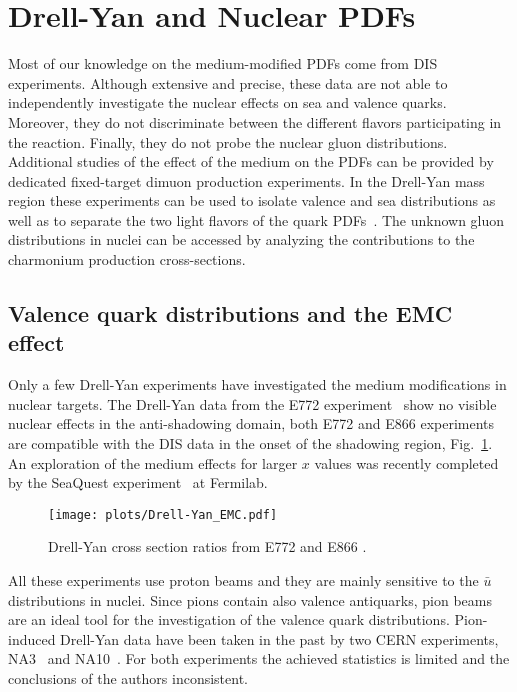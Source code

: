\section{Drell-Yan and Nuclear PDFs\label{sec:DY}}
%
Most of our knowledge on the medium-modified PDFs come from DIS experiments. Although extensive and precise, these data are not able to independently investigate the nuclear effects on sea and valence quarks. Moreover, they do not discriminate between the different flavors participating in the reaction. Finally, they do not probe the nuclear gluon distributions. Additional studies of the effect of the medium on the PDFs can be provided by dedicated fixed-target dimuon production experiments. In the Drell-Yan mass region  these experiments can be used to isolate valence and sea distributions as well as to separate the two light flavors of the quark PDFs~\cite{Bickerstaff:1985ax}. The unknown gluon distributions in nuclei can be accessed by analyzing the contributions to the charmonium production cross-sections. 
 
\subsection {Valence quark distributions and the EMC effect}
Only a few Drell-Yan experiments have investigated the medium modifications in nuclear targets. 
The Drell-Yan data from the E772 experiment~\cite{Alde:1990im} show no visible nuclear effects in 
the anti-shadowing domain, both E772 and E866 experiments~\cite{Vasilev:1999fa} are compatible 
with the DIS data in the onset of the shadowing region, Fig.~\ref{fig:drell-yan}.  An exploration of the medium effects for larger $x$ values was recently completed by the SeaQuest experiment~\cite{seaquest} at Fermilab. 

\begin{figure}[tbp]
  \centering\texttt{[image: plots/Drell-Yan\_EMC.pdf]}
  \caption{Drell-Yan cross section ratios from E772 and E866 \cite{Alde:1990im, Vasilev:1999fa}.}
  \label{fig:drell-yan}
\end{figure}

All these experiments use proton beams and they are mainly sensitive to the $\bar{u}$
distributions in nuclei.  Since pions contain also valence antiquarks, pion beams are  
an ideal tool for the investigation of the valence quark distributions. Pion-induced Drell-Yan data have 
been taken in the past by two CERN experiments, NA3~\cite{Badier:1981ci} 
and NA10~\cite{Bordalo:1987cs}.  For both experiments the achieved statistics is limited
and the conclusions of the authors inconsistent.  

